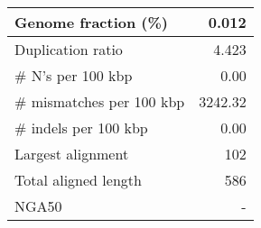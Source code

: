 \documentclass[12pt,a4paper]{article}
\begin{document}
\begin{table}[ht]
\begin{center}
\begin{tabular}{|l*{1}{|r}|}
Genome fraction (\%) & 0.012 \\ \hline
Duplication ratio & 4.423 \\ \hline
\# N's per 100 kbp & 0.00 \\ \hline
\# mismatches per 100 kbp & 3242.32 \\ \hline
\# indels per 100 kbp & 0.00 \\ \hline
Largest alignment & 102 \\ \hline
Total aligned length & 586 \\ \hline
NGA50 & - \\ \hline
\end{tabular}
\end{center}
\end{table}
\end{document}
